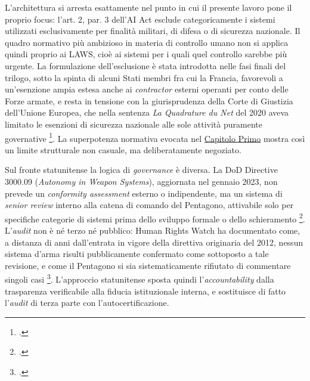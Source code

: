 \documentclass[a4paper,12pt]{report}
\begin{document}
L'architettura si arresta esattamente nel punto in cui il presente lavoro pone il
proprio focus: l'art. 2, par. 3 dell'AI Act esclude categoricamente i sistemi
utilizzati esclusivamente per finalità militari, di difesa o di sicurezza
nazionale. Il quadro normativo più ambizioso in materia di controllo umano non si
applica quindi proprio ai LAWS, cioè ai sistemi per i quali quel controllo
sarebbe più urgente. La formulazione dell'esclusione è stata introdotta nelle fasi
finali del trilogo, sotto la spinta di alcuni Stati membri fra cui la Francia,
favorevoli a un'esenzione ampia estesa anche ai \textit{contractor} esterni
operanti per conto delle Forze armate, e resta in tensione con la giurisprudenza
della Corte di Giustizia dell'Unione Europea, che nella sentenza \textit{La
Quadrature du Net} del 2020 aveva limitato le esenzioni di sicurezza nazionale
alle sole attività puramente governative
\footcite{vogiatzoglou_2024_ai_act_exception}. La superpotenza normativa evocata
nel \hyperref[cap1]{Capitolo Primo} mostra così un limite strutturale non casuale, ma
deliberatamente negoziato.

Sul fronte statunitense la logica di \textit{governance} è diversa. La DoD
Directive 3000.09 (\textit{Autonomy in Weapon Systems}), aggiornata nel gennaio
2023, non prevede un \textit{conformity assessment} esterno o indipendente, ma un
sistema di \textit{senior review} interno alla catena di comando del Pentagono,
attivabile solo per specifiche categorie di sistemi prima dello sviluppo formale
o dello schieramento \footcite{dod_directive_3000_09}. L'\textit{audit} non è né
terzo né pubblico: Human Rights Watch ha documentato come, a distanza di anni
dall'entrata in vigore della direttiva originaria del 2012, nessun sistema d'arma
risulti pubblicamente confermato come sottoposto a tale revisione, e come il
Pentagono si sia sistematicamente rifiutato di commentare singoli casi
\footcite{hrw_2023_dod3009review}. L'approccio statunitense sposta quindi
l'\textit{accountability} dalla trasparenza verificabile alla fiducia
istituzionale interna, e sostituisce di fatto l'\textit{audit} di terza parte con
l'autocertificazione.
\end{document}
